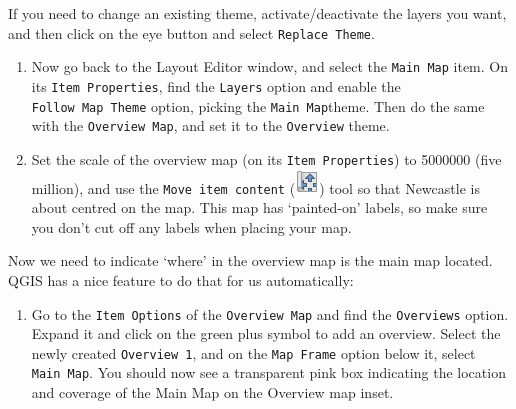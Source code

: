 \documentclass[
  letterpaper,
  DIV=11,
  numbers=noendperiod]{scrreprt}
\providecommand{\tightlist}{%
  \setlength{\itemsep}{0pt}\setlength{\parskip}{0pt}}\usepackage{longtable,booktabs,array}
\begin{document}
\begin{tcolorbox}[enhanced jigsaw, coltitle=black, toprule=.15mm, breakable, opacitybacktitle=0.6, left=2mm, colback=white, leftrule=.75mm, rightrule=.15mm, colbacktitle=quarto-callout-tip-color!10!white, toptitle=1mm, titlerule=0mm, colframe=quarto-callout-tip-color-frame, arc=.35mm, bottomtitle=1mm, opacityback=0, bottomrule=.15mm, title=\textcolor{quarto-callout-tip-color}{\faLightbulb}\hspace{0.5em}{Tip}]

If you need to change an existing theme, activate/deactivate the layers
you want, and then click on the eye button and select
\texttt{Replace\ Theme}.

\end{tcolorbox}

\begin{enumerate}
\def\labelenumi{(\arabic{enumi})}
\setcounter{enumi}{274}
\item
  Now go back to the Layout Editor window, and select the
  \texttt{Main\ Map} item. On its \texttt{Item\ Properties}, find the
  \texttt{Layers} option and enable the \texttt{Follow\ Map\ Theme}
  option, picking the \texttt{Main\ Map}theme. Then do the same with the
  \texttt{Overview\ Map}, and set it to the \texttt{Overview} theme.
\item
  Set the scale of the overview map (on its \texttt{Item\ Properties})
  to 5000000 (five million), and use the \texttt{Move\ item\ content}
  (\includegraphics{index_files/mediabag/mActionMoveItemConte1.png})
  tool so that Newcastle is about centred on the map. This map has
  `painted-on' labels, so make sure you don't cut off any labels when
  placing your map.
\end{enumerate}

Now we need to indicate `where' in the overview map is the main map
located. QGIS has a nice feature to do that for us automatically:

\begin{enumerate}
\def\labelenumi{(\arabic{enumi})}
\setcounter{enumi}{276}
\tightlist
\item
  Go to the \texttt{Item\ Options} of the \texttt{Overview\ Map} and
  find the \texttt{Overviews} option. Expand it and click on the green
  plus symbol to add an overview. Select the newly created
  \texttt{Overview\ 1}, and on the \texttt{Map\ Frame} option below it,
  select \texttt{Main\ Map}. You should now see a transparent pink box
  indicating the location and coverage of the Main Map on the Overview
  map inset.
\end{enumerate}
\end{document}
